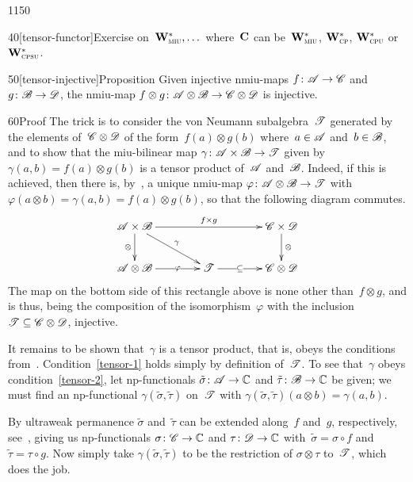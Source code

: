 \begin{parsec}{1150}
\begin{point}{40}[tensor-functor]{Exercise}
{on~$\mathbf{W}^*_{\text{\textsc{miu}}},\dotsc$}%
where~$\mathbf{C}$
can be~$\mathbf{W}^*_{\text{\textsc{miu}}}$, $\mathbf{W}^*_{\text{\textsc{cp}}}$, $\mathbf{W}^*_{\text{\textsc{cpu}}}$
or $\mathbf{W}^*_{\text{\textsc{cpsu}}}$.
\end{point}
\begin{point}{50}[tensor-injective]{Proposition}%
Given injective nmiu-maps
$f\colon \mathscr{A}\to\mathscr{C}$ and~$g\colon \mathscr{B}\to\mathscr{D}$,
the nmiu-map $f\otimes g\colon \mathscr{A}\otimes \mathscr{B}\to
\mathscr{C}\otimes\mathscr{D}$ is injective.
\begin{point}{60}{Proof}%
The trick
is to consider the von Neumann subalgebra~$\mathscr{T}$
generated by
the elements of~$\mathscr{C}\otimes \mathscr{D}$
of the form~$f(a)\otimes g(b)$
where~$a\in\mathscr{A}$ and~$b\in\mathscr{B}$,
and to show that  the miu-bilinear map
$\gamma\colon \mathscr{A}\times\mathscr{B}\to\mathscr{T}$
given by~$\gamma(a,b)=f(a)\otimes g(b)$
is a tensor product of~$\mathscr{A}$ and~$\mathscr{B}$.
Indeed,
if this is achieved,
then
there is, by~,
a unique nmiu-map $\varphi\colon \mathscr{A}\otimes\mathscr{B}\to\mathscr{T}$
with $\varphi(a\otimes b)=\gamma(a,b)
=f(a)\otimes g(b)$,
so that the following diagram commutes.
\begin{equation*}
\xymatrix@C=4em{
\scrA\times \scrB
\ar[rr]^-{f\times g}
\ar[rd]^-\gamma
\ar[d]_-\otimes
&
&
\scrC\times\scrD 
\ar[d]^-\otimes
\\
\scrA\otimes\scrB
\ar[r]|-\varphi
&
\scrT
\ar[r]|-\subseteq
&
\scrC\otimes\scrD
}
\end{equation*}
The map on the bottom side of this rectangle above is
none other than~$f\otimes g$,
and is thus,
being
the composition of the isomorphism~$\varphi$
with the inclusion $\mathscr{T}\subseteq \mathscr{C}\otimes\mathscr{D}$,
injective.

It remains to be shown that~$\gamma$
is a tensor product,
that is, obeys the conditions from~.
Condition~\ref{tensor-1}
holds simply by definition of~$\mathscr{T}$.
To see that~$\gamma$
obeys condition~\ref{tensor-2},
let np-functionals
$\tilde\sigma\colon \mathscr{A}\to\mathbb{C}$
and $\tilde\tau\colon \mathscr{B}\to\mathbb{C}$ be given;
we must find an np-functional $\gamma(\tilde\sigma,
\tilde\tau)$ on~$\mathscr{T}$
with $\gamma(\tilde\sigma,\tilde\tau)(a\otimes b)
= \gamma(a,b)$.

By ultraweak permanence
$\tilde\sigma$ and~$\tilde\tau$
can be extended along~$f$ and~$g$, respectively,
see~,
giving us np-functionals $\sigma\colon \mathscr{C}\to\mathbb{C}$
and $\tau\colon\mathscr{D}\to\mathbb{C}$
with~$\tilde\sigma = \sigma\circ f$
and $\tilde\tau = \tau\circ g$.
Now simply take $\gamma(\tilde\sigma,\tilde\tau)$
to be the restriction
of $\sigma\otimes \tau$
to~$\mathscr{T}$,
which does the job.


\end{point}
\end{point}
\end{parsec}

